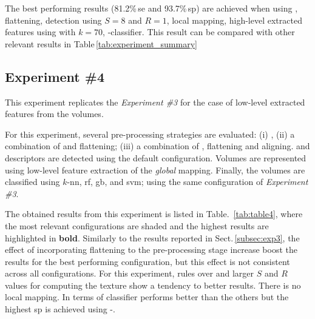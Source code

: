 The best performing results (81.2\%\,\ac{se} and 93.7\%\,\ac{sp}) are achieved when using \nlm, flattening, \lbp detection using $S=8$ and $R=1$, local mapping, high-level extracted features using \bow with $k=70$, \rbf-\svm classifier. This result can be compared with other relevant results in Table\,\ref{tab:experiment_summary}

\subsection{Experiment \#4}\label{subsec:exp4}
%
%
%
%

This experiment replicates the \emph{Experiment \#3} for the case of low-level extracted features from the volumes.

For this experiment, several pre-processing strategies are evaluated: (i) \nlm, (ii) a combination of \nlm and flattening; (iii) a combination of \nlm, flattening and aligning.
\lbp and \lbptop descriptors are detected using the default configuration.
Volumes are represented using low-level feature extraction of the \emph{global} mapping.
Finally, the volumes are classified using $k$-\ac{nn}, \ac{rf}, \ac{gb}, and \ac{svm}; using the same configuration of \emph{Experiment \#3}.

The obtained results from this experiment is listed in Table.~\ref{tab:table4}, where the most relevant configurations are shaded and the highest results are highlighted in \textbf{bold}.
Similarly to the results reported in Sect.\,\ref{subsec:exp3}, the effect of incorporating flattening to the pre-processing stage increase boost the results for the best performing configuration, but this effect is not consistent across all configurations.
For this experiment, \lbptop rules over \lbp and larger $S$ and $R$ values for computing the texture show a tendency to better results. 
There is no local mapping.
In terms of classifier \rf performs better than the others but the highest \ac{sp} is achieved using \rbf-\svm.



